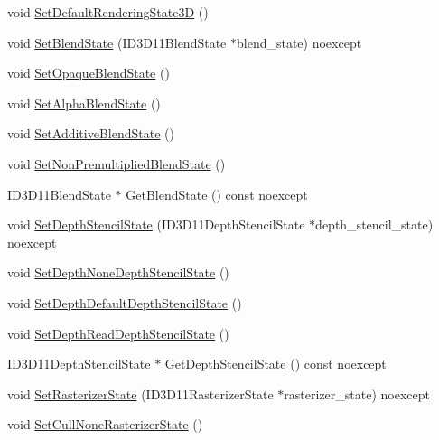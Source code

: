 \begin{DoxyCompactItemize}
\item 
void \hyperlink{structmage_1_1_rendering_state_ac6029d9fdc873317b97f60d59b88e7a7}{Set\+Default\+Rendering\+State3D} ()
\item 
void \hyperlink{structmage_1_1_rendering_state_aa91119e7704856c097adb20b6080a26e}{Set\+Blend\+State} (I\+D3\+D11\+Blend\+State $\ast$blend\+\_\+state) noexcept
\item 
void \hyperlink{structmage_1_1_rendering_state_ab0f578405f3c880234757e152be1a670}{Set\+Opaque\+Blend\+State} ()
\item 
void \hyperlink{structmage_1_1_rendering_state_a7f97752f22b0a32912f24d16c1aa2441}{Set\+Alpha\+Blend\+State} ()
\item 
void \hyperlink{structmage_1_1_rendering_state_a61341d0fc7f1140faaf8fb33f9bb13fb}{Set\+Additive\+Blend\+State} ()
\item 
void \hyperlink{structmage_1_1_rendering_state_acf313a797964e3a86dde2799a42f2db3}{Set\+Non\+Premultiplied\+Blend\+State} ()
\item 
I\+D3\+D11\+Blend\+State $\ast$ \hyperlink{structmage_1_1_rendering_state_ac1a0e8f7ba3865eaf0ec8445664a6a43}{Get\+Blend\+State} () const noexcept
\item 
void \hyperlink{structmage_1_1_rendering_state_ad6081a1d840e30f58a8090f80e59b8fe}{Set\+Depth\+Stencil\+State} (I\+D3\+D11\+Depth\+Stencil\+State $\ast$depth\+\_\+stencil\+\_\+state) noexcept
\item 
void \hyperlink{structmage_1_1_rendering_state_a67db088d08560ab5f3adde28032972a4}{Set\+Depth\+None\+Depth\+Stencil\+State} ()
\item 
void \hyperlink{structmage_1_1_rendering_state_a88933420c94d4127973d8148ccd97e86}{Set\+Depth\+Default\+Depth\+Stencil\+State} ()
\item 
void \hyperlink{structmage_1_1_rendering_state_a86ff2bb5739ada7ffcc275f4624d2a24}{Set\+Depth\+Read\+Depth\+Stencil\+State} ()
\item 
I\+D3\+D11\+Depth\+Stencil\+State $\ast$ \hyperlink{structmage_1_1_rendering_state_a8a11db948fdf3c84bf55346877fcc020}{Get\+Depth\+Stencil\+State} () const noexcept
\item 
void \hyperlink{structmage_1_1_rendering_state_a44d2892e59966697e79b80eb0cd847f7}{Set\+Rasterizer\+State} (I\+D3\+D11\+Rasterizer\+State $\ast$rasterizer\+\_\+state) noexcept
\item 
void \hyperlink{structmage_1_1_rendering_state_a4841e36e7be34f949da1d4088f217a1a}{Set\+Cull\+None\+Rasterizer\+State} ()
\item 

\end{DoxyCompactItemize}
